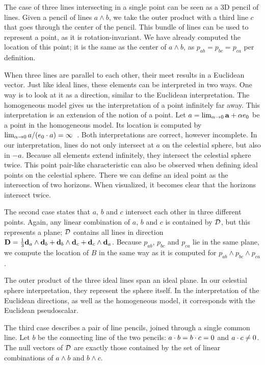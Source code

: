 The case of three lines intersecting in a single point can be seen as a 3D pencil of lines.  Given a pencil of lines $a \wedge b$, we take the outer product with a third line $c$ that goes through the center of the pencil.  This bundle of lines can be used to represent a point, as it is rotation-invariant.  We have already computed the location of this point; it is the same as the center of $a \wedge b$, as $p_{ab} = p_{bc} = p_{ca}$ per definition.

When three lines are parallel to each other, their meet results in a Euclidean vector.  Just like ideal lines, these elements can be interpreted in two ways.  One way is to look at it as a direction, similar to the Euclidean interpretation.  The homogeneous model gives us the interpretation of a point infinitely far away.  This interpretation is an extension of the notion of a point.  Let $a = \lim_{\alpha \to 0} \mathbf{a} + \alpha e_0$ be a point in the homogeneous model.  Its location is computed by $\lim_{\alpha \to 0} a / (e_0 \mathbin{\cdot} a) = \infty$~\cite[Section 11.2]{TheBook}.  Both interpretations are correct, however incomplete.  In our interpretation, lines do not only intersect at $a$ on the celestial sphere, but also in $-a$.  Because all elements extend infinitely, they intersect the celestial sphere twice.  This point pair-like characteristic can also be observed when defining ideal points on the celestial sphere.  There we can define an ideal point as the intersection of two horizons.  When visualized, it becomes clear that the horizons intersect twice.

The second case states that $a$, $b$ and $c$ intersect each other in three different points.  Again, any linear combination of $a$, $b$ and $c$ is contained by $\mathcal{D}$, but this represents a plane; $\mathcal{D}$ contains all lines in direction $\mathbf{D} = \frac{1}{3} \mathbf{d}_a \wedge \mathbf{d}_b + \mathbf{d}_b \wedge \mathbf{d}_c + \mathbf{d}_c \wedge \mathbf{d}_a$.  Because $p_{ab}$, $p_{bc}$ and $p_{ca}$ lie in the same plane, we compute the location of $B$ in the same way as it is computed for $p_{ab} \wedge p_{bc} \wedge p_{ca}$.

The outer product of the three ideal lines span an ideal plane.  In our celestial sphere interpretation, they represent the sphere itself.  In the interpretation of the Euclidean directions, as well as the homogeneous model, it corresponds with the Euclidean pseudoscalar.

The third case describes a pair of line pencils, joined through a single common line.  Let $b$ be the connecting line of the two pencils: $a \mathbin{\cdot} b = b \mathbin{\cdot} c = 0$ and $a \mathbin{\cdot} c \not= 0$. The null vectors of $\mathcal{D}$ are exactly those contained by the set of linear combinations of $a \wedge b$ and $b \wedge c$.

